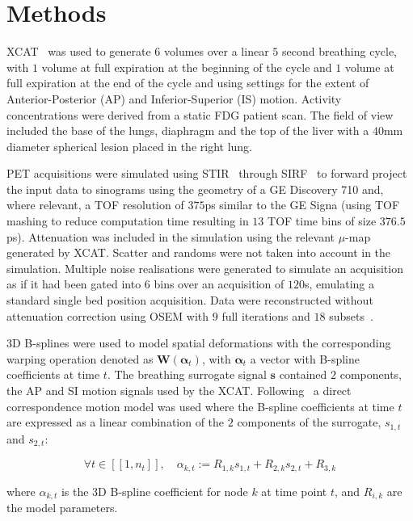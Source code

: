 \documentclass{IEEEtran}
\begin{document}
\section{Methods}
XCAT~\cite{Segars2010} was used to generate $6$ volumes over a linear $5$ second breathing cycle, with $1$ volume at full expiration at the beginning of the cycle and $1$ volume at full expiration at the end of the cycle and using settings for the extent of Anterior-Posterior (AP) and Inferior-Superior (IS) motion. Activity concentrations were derived from a static FDG patient scan. The field of view included the base of the lungs, diaphragm and the top of the liver with a $40$mm diameter spherical lesion placed in the right lung.

PET acquisitions were simulated using STIR~\cite{Thielemans2012,Efthimiou2018} through SIRF~\cite{Ovtchinnikov2017} to forward project the input data to sinograms using the geometry of a GE Discovery 710 and, where relevant, a TOF resolution of $375$ps similar to the GE Signa (using TOF mashing to reduce computation time resulting in $13$ TOF time bins of size $376.5$ps). Attenuation was included in the simulation using the relevant $\mu$-map generated by XCAT. Scatter and randoms were not taken into account in the simulation. Multiple noise realisations were generated to simulate an acquisition as if it had been gated into $6$ bins over an acquisition of $120$s, emulating a standard single bed position acquisition. Data were reconstructed without attenuation correction using OSEM with $9$ full iterations and $18$ subsets~\cite{Hudson1994}. 

3D B-splines were used to model spatial deformations with the corresponding warping operation denoted as $\mathbf{W}(\mathbf{\alpha}_t)$, with $\mathbf{\alpha}_t$ a vector with B-spline coefficients at time $t$. The breathing surrogate signal $\mathbf{s}$ contained $2$ components, the AP and SI motion signals used by the XCAT.  Following~\cite{McClelland2013} a direct correspondence motion model was used where the B-spline coefficients at time $t$ are expressed as a linear combination of the $2$ components of the surrogate, $s_{1,t}$ and $s_{2,t}$:

\begin{equation}
    \forall t \in [[1,n_t]],\quad \alpha_{k,t} := R_{1,k} s_{1,t} + R_{2,k} s_{2,t} + R_{3,k}
\end{equation}

\noindent where $\alpha_{k,t}$ is the 3D B-spline coefficient for node $k$ at time point $t$, and $R_{i,k}$ are the model parameters. 
\end{document}
